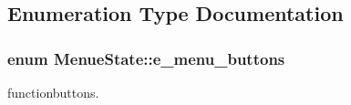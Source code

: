 \subsection{Enumeration Type Documentation}
\hypertarget{namespaceMenueState_a77fb3d41627d31d4687141a0b378ba8f}{
\subsubsection[{e\-\_\-menu\-\_\-buttons}]{\setlength{\rightskip}{0pt plus 5cm}enum {\bf Menue\-State\-::e\-\_\-menu\-\_\-buttons}}}\label{namespaceMenueState_a77fb3d41627d31d4687141a0b378ba8f}


functionbuttons. 

